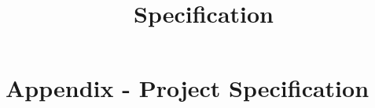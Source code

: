 \documentclass[a4paper,fleqn,12pt]{article}
\begin{document}
\pagestyle{plain}







\newpage
\title{Specification}
\section{Appendix - Project Specification}





\printbibliography
\end{document}
